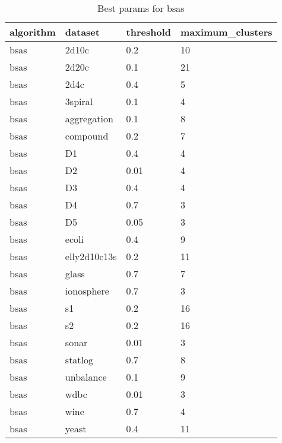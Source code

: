 \begin{table}[H]
\centering
\caption{Best params for bsas}
\label{tab:params:bsas}
\begin{tabular}{|l|l|l|l|}
\hline
algorithm & dataset & threshold & maximum\_clusters \\
\hline
bsas & 2d10c & 0.2 & 10 \\
\hline
bsas & 2d20c & 0.1 & 21 \\
\hline
bsas & 2d4c & 0.4 & 5 \\
\hline
bsas & 3spiral & 0.1 & 4 \\
\hline
bsas & aggregation & 0.1 & 8 \\
\hline
bsas & compound & 0.2 & 7 \\
\hline
bsas & D1 & 0.4 & 4 \\
\hline
bsas & D2 & 0.01 & 4 \\
\hline
bsas & D3 & 0.4 & 4 \\
\hline
bsas & D4 & 0.7 & 3 \\
\hline
bsas & D5 & 0.05 & 3 \\
\hline
bsas & ecoli & 0.4 & 9 \\
\hline
bsas & elly2d10c13s & 0.2 & 11 \\
\hline
bsas & glass & 0.7 & 7 \\
\hline
bsas & ionosphere & 0.7 & 3 \\
\hline
bsas & s1 & 0.2 & 16 \\
\hline
bsas & s2 & 0.2 & 16 \\
\hline
bsas & sonar & 0.01 & 3 \\
\hline
bsas & statlog & 0.7 & 8 \\
\hline
bsas & unbalance & 0.1 & 9 \\
\hline
bsas & wdbc & 0.01 & 3 \\
\hline
bsas & wine & 0.7 & 4 \\
\hline
bsas & yeast & 0.4 & 11 \\
\hline
\end{tabular}
\end{table}